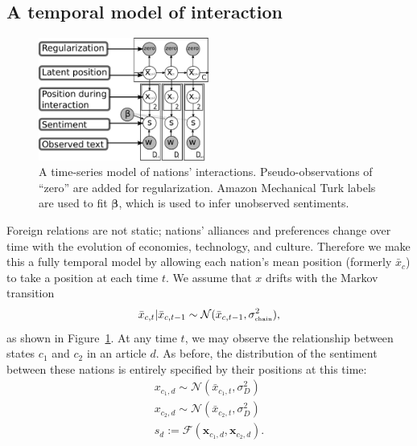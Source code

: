 \subsection{A temporal model of interaction}
\label{sec:fr_time_series_model}
\begin{figure}
  \center
  \includegraphics[width=0.5\textwidth]{chapter_foreign_relations/figures/countries_gm.pdf}
  \caption{A time-series model of nations' interactions.
    Pseudo-observations of ``zero'' are added for regularization.
    Amazon Mechanical Turk labels are used to fit $\bm \beta$, which is
    used to infer unobserved sentiments.}
  \label{fig:fa_gm}
\end{figure}

Foreign relations are not static; nations' alliances and preferences
change over time with the evolution of economies, technology, and
culture.  Therefore we make this a fully temporal model by
allowing each nation's mean position (formerly $\bar x_{c}$) to take a position at each time $t$.  We assume that $x$ drifts with the Markov transition
\begin{align}
  \label{eq:fr_interaction_position_given_mean}
  \bar x_{c,t} | \bar x_{c,t-1} \sim \mathcal{N}(\bar x_{c,t-1},
  \sigma_{\mbox{\tiny chain}}^2),
\end{align}
as shown in Figure~\ref{fig:fa_gm}. At any time $t$, we may observe
the relationship between states $c_1$ and $c_2$ in an article $d$.  As
before, the distribution of the sentiment between these nations is
entirely specified by their positions at this time:
\begin{align}
  x_{c_1,d} \sim \mathcal{N}(\bar x_{c_1, t}, \sigma_D^2) \nonumber \\
  x_{c_2,d} \sim \mathcal{N}(\bar x_{c_2, t}, \sigma_D^2) \nonumber \\
  s_d := \mathcal{F}(\bm x_{c_1,d}, \bm x_{c_2,d}). \label{eq:sentiment_space}
\end{align}

